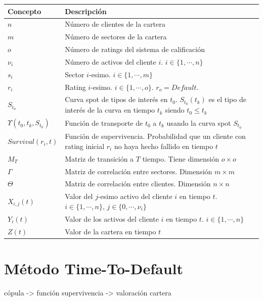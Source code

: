 \begin{tabular}{|p{2.5cm}|p{9cm}|}
\hline
Concepto & Descripci\'on \\
\hline
\hline
$n$ & N\'umero de clientes de la cartera \\
\hline
$m$ & N\'umero de sectores de la cartera \\
\hline
$o$ & N\'umero de ratings del sistema de calificaci\'on \\
\hline
$\nu_i$ &  N\'umero de activos del cliente $i$. $i \in \{1,\cdots,n\}$\\
\hline
\hline
$s_i$ & Sector $i$-esimo. $i \in \{1,\cdots,m\}$ \\
\hline
$r_i$ & Rating $i$-esimo. $i \in \{1,\cdots,o\}$. $r_o=Default$. \\
\hline
\hline
$S_{t_0}$ & Curva spot de tipos de inter\'es en $t_0$. $S_{t_0}(t_k)$ es el
tipo de inter\'es de la curva en tiempo $t_k$ siendo $t_0 \leq t_k$\\
\hline
$\Upsilon(t_0,t_k, S_{t_0})$ & Funci\'on de transporte de $t_0$ a $t_k$ usando 
la curva spot $S_{t_0}$ \\
\hline
\hline
$Survival(r_i,t)$ & Funci\'on de supervivencia. Probabilidad que un cliente con 
rating inicial $r_i$ no haya hecho fallido en tiempo $t$\\
\hline
$M_T$ & Matriz de transici\'on a $T$ tiempo. Tiene dimensi\'on $o \times o$\\
\hline
$\Gamma$ & Matriz de correlaci\'on entre sectores. Dimensi\'on $m \times m$\\
\hline
$\Theta$ & Matriz de correlaci\'on entre clientes. Dimensi\'on $n \times n$\\
\hline
\hline
$X_{i,j}(t)$ & Valor del $j$-esimo activo del cliente $i$ en tiempo $t$. $i \in \{1,\cdots,n\}$, 
$j \in \{0,\cdots,\nu_i\}$ \\
\hline
$Y_i(t)$ & Valor de los activos del cliente $i$ en tiempo $t$. $i \in \{1,\cdots,n\}$ \\
\hline
$Z(t)$ & Valor de la cartera en tiempo $t$\\
\hline
\end{tabular}

\section{M\'etodo Time-To-Default}
c\'opula -> funci\'on supervivencia -> valoraci\'on cartera

